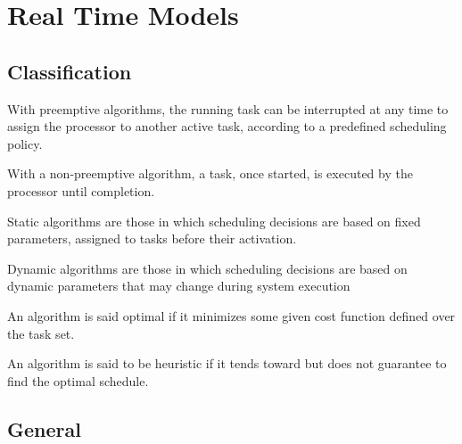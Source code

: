 



\section{Real Time Models}

\subsection{Classification}
\begin{definition} 
With preemptive algorithms, the running task can be 
interrupted at any time to assign the processor to another 
active task, according to a predefined scheduling policy.
\end{definition}

\begin{definition} 
With a non-preemptive algorithm, a task, once started, is 
executed by the processor until completion.
\end{definition}

\begin{definition} 
Static algorithms
are those in which scheduling decisions 
are based on fixed parameters, assigned to tasks before 
their activation.
\end{definition}

\begin{definition}
Dynamic algorithms
are those in which scheduling 
decisions are based on dynamic parameters that may 
change during system execution

\end{definition}

\begin{definition}[Optimal]
An algorithm is said optimal if it minimizes some given 
cost function defined over the task set.
\end{definition}

\begin{definition}[Heuristic]
An algorithm is said to be heuristic if it tends toward but 
does not guarantee to find the optimal schedule.
\end{definition}

\subsection{General}

